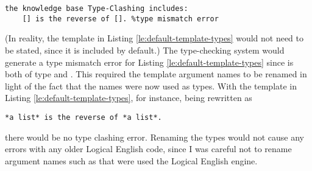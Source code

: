\documentclass[../main.tex]{subfiles}
\begin{document}
{\begin{lstlisting}[language={LE},caption={A Logical English program using a default template in which the types are inconsistent.},label={le:default-template-types}]
    the knowledge base Type-Clashing includes:
    [] is the reverse of []. %type mismatch error
\end{lstlisting}
(In reality, the template in Listing \ref{le:default-template-types} would not need to be stated, since it is included by default.) The type-checking system would generate a type mismatch error for Listing \ref{le:default-template-types} since \codeword{[]} is both of type  and .
This required the template argument names to be renamed in light of the fact that the names were now used as types. With the template in Listing \ref{le:default-template-types}, for instance, being rewritten as
\begin{lstlisting}[language={LE}]
    *a list* is the reverse of *a list*.
\end{lstlisting}
there would be no type clashing error. Renaming the types would not cause any errors with any older Logical English code, since I was careful not to rename argument names such as  that were used the Logical English engine.

}
\end{document}
